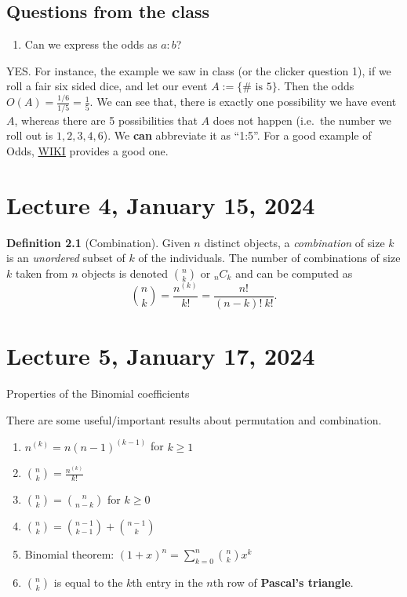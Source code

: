 \documentclass[
]{book}
\providecommand{\tightlist}{%
  \setlength{\itemsep}{0pt}\setlength{\parskip}{0pt}}
\theoremstyle{definition}
\newtheorem{definition}{Definition}[chapter]
\theoremstyle{definition}
\theoremstyle{definition}
\theoremstyle{definition}
\theoremstyle{remark}
\begin{document}
\section{Questions from the class}\label{questions-from-the-class-1}

\begin{enumerate}
\def\labelenumi{\arabic{enumi}.}
\tightlist
\item
  Can we express the odds as \(a:b\)?
\end{enumerate}

YES. For instance, the example we saw in class (or the clicker question 1), if we roll a fair six sided dice, and let our event \(A:=\{\text{# is } 5 \}\). Then the odds \(O(A)=\frac{1/6}{1/5}=\frac{1}{5}\). We can see that, there is exactly one possibility we have event \(A\), whereas there are 5 possibilities that \(A\) does not happen (i.e.~the number we roll out is \(1,2,3,4,6\)). We \textbf{can} abbreviate it as ``1:5''. For a good example of Odds, \href{https://en.wikipedia.org/wiki/Odds}{WIKI} provides a good one.

\chapter{Lecture 4, January 15, 2024}\label{lecture-4-january-15-2024}

\begin{definition}[Combination]
Given \(n\) distinct objects, a \emph{combination} of size \(k\) is an \emph{unordered} subset of \(k\) of the individuals. The number of combinations of size \(k\) taken from \(n\) objects is denoted \({n \choose k}\) or \({}_n C_k\) and can be computed as
\[
{n \choose k}=\frac{n^{(k)}}{k!}=\frac{n!}{(n-k)!\ k!}.
\]
\end{definition}

\chapter{Lecture 5, January 17, 2024}\label{lecture-5-january-17-2024}

Properties of the Binomial coefficients

There are some useful/important results about permutation and combination.

\begin{enumerate}
\def\labelenumi{\arabic{enumi}.}
\tightlist
\item
  \(n^{(k)} = n (n - 1)^{(k-1)}\) for \(k \geq 1\)
\item
  \({n \choose k} = \frac{n^{(k)}}{k!}\)
\item
  \({n \choose k} = {n \choose n-k}\) for \(k \geq 0\)
\item
  \({n \choose k} = {n-1 \choose k-1} + {n-1 \choose k}\)
\item
  Binomial theorem: \((1 + x)^n = \sum_{k=0}^n {n \choose k} x^k\)
\item
  \({n \choose k}\) is equal to the \(k\)th entry in the \(n\)th row of \textbf{Pascal's triangle}.
\end{enumerate}
\end{document}
